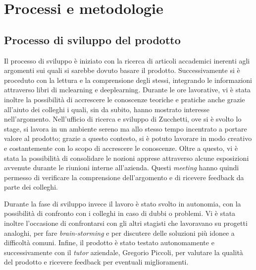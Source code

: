 \chapter{Processi e metodologie}
\label{chap:processi-metodologie}

\section{Processo di sviluppo del prodotto}
Il processo di sviluppo è iniziato con la ricerca di articoli accademici inerenti agli argomenti sui quali si sarebbe dovuto basare il prodotto. Successivamente si è proceduto con la lettura e la comprensione degli stessi, integrando le informazioni attraverso libri di \gls{mclearning} e \gls{deeplearning}.
Durante le ore lavorative, vi è stata inoltre la possibilità di accrescere le conoscenze teoriche e pratiche anche grazie all'aiuto dei colleghi i quali, sin da subito, hanno mostrato interesse nell'argomento.
Nell'ufficio di ricerca e sviluppo di Zucchetti, ove si è svolto lo stage, si lavora in un ambiente sereno ma allo stesso tempo incentrato a portare valore al prodotto; grazie a questo contesto, si è potuto lavorare in modo creativo e costantemente con lo scopo di accrescere le conoscenze.
Oltre a questo, vi è stata la possibilità di consolidare le nozioni apprese attraverso alcune esposizioni avvenute durante le riunioni interne all'azienda. Questi \textit{meeting} hanno quindi permesso di verificare la comprensione dell'argomento e di ricevere feedback da parte dei colleghi.

Durante la fase di sviluppo invece il lavoro è stato svolto in autonomia, con la possibilità di confronto con i colleghi in caso di dubbi o problemi.
Vi è stata inoltre l'occasione di confrontarsi con gli altri stagisti che lavoravano su progetti analoghi, per fare \textit{brain-storming} e per discutere delle soluzioni più idonee a difficoltà comuni.
Infine, il prodotto è stato testato autonomamente e successivamente con il \textit{tutor} aziendale, Gregorio Piccoli, per valutare la qualità del prodotto e ricevere feedback per eventuali miglioramenti.


